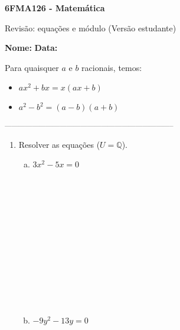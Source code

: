 \documentclass[a4paper,14pt]{article}
\begin{document}
	
	\noindent\textbf{6FMA126 - Matemática} 
	
	\begin{center}Revisão: equações e módulo (Versão estudante)
	\end{center}
	
	\noindent\textbf{Nome:} \underline{\hspace{10cm}}
	\noindent\textbf{Data:} \underline{\hspace{4cm}}
	
	
	\begin{multicols}{2}
	    \noindent Para quaisquer $a$ e $b$ racionais, temos: \\
	    \begin{itemize}
	    	\item $ax^2 + bx = x(ax + b)$
	    	\item $a^2 - b^2 = (a - b)(a + b)$
	    \end{itemize}
		\noindent\textsubscript{--------------------------------------------------------------------------}
		\begin{enumerate} 
			\item Resolver as equações ($U = \mathbb{Q}$).
			\begin{enumerate}[a)]
				\item $3x^2 - 5x = 0$ \\\\\\\\\\\\\\\\\\\\\\\\\\
				\item $-9y^2 - 13y = 0$ \\\\\\\\\\\\\\\\\\\\\\

\end{enumerate}
\end{enumerate}
\end{multicols}
\end{document}
